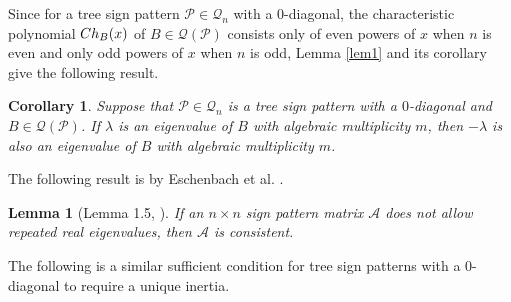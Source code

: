 \documentclass[10pt,a4paper]{amsart}
\newtheorem{lemma}{Lemma}[section]
\newtheorem{cor}{Corollary}[section]
\numberwithin{equation}{section}
\def\Ch{{\rm Ch}}
\begin{document}
	
	Since for a tree sign pattern $\mathcal{P} \in \mathcal{Q}_n$ with a $0$-diagonal, the characteristic polynomial $\Ch_B(x)$ of $B \in \mathcal{Q}(\mathcal{P})$ consists only of even powers of $x$ when $n$ is even and only odd powers of $x$ when $n$ is odd, Lemma \ref{lem1} and its corollary give the following result.
	\begin{cor}\label{c1}
		Suppose that $\mathcal{P}\in \mathcal{Q}_n$ is a tree sign pattern with a $0$-diagonal and $B\in \mathcal{Q}(\mathcal{P})$. If $\lambda$ is an eigenvalue of $B$ with algebraic multiplicity $m$, then $-\lambda$ is also an eigenvalue of $B$ with algebraic multiplicity $m$.
	\end{cor}
	The following result is by Eschenbach et al. \cite{1}.
	\begin{lemma}[Lemma 1.5, \cite{1}] \label{l1}
		If an $n\times n$ sign pattern matrix $\mathcal{A}$ does not allow repeated real eigenvalues, then $\mathcal{A}$ is consistent.
	\end{lemma}
	
	
	The following is a similar sufficient condition for tree sign patterns with a $0$-diagonal to require a unique inertia.
	
\end{document}
